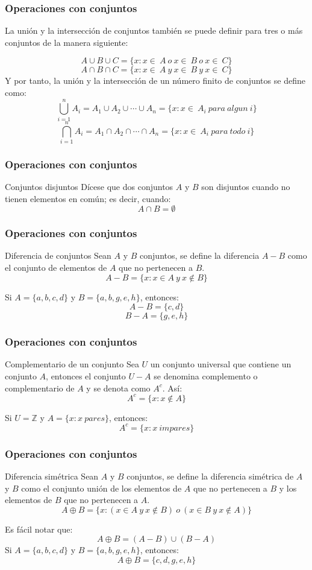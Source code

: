 \documentclass{beamer}
\begin{document}
\begin{frame}
\frametitle{Operaciones con conjuntos}
La uni\'on y la intersecci\'on de conjuntos tambi\'en se puede definir para tres o m\'as conjuntos de la manera siguiente:

\[A\cup B \cup C = \{x:x\in\ A\ o \ x\in\ B\ o \ x\in\ C\}\]
\[A\cap B \cap C = \{x:x\in\ A\ y \ x\in\ B\ y \ x\in\ C\}\]
Y por tanto, la uni\'on y la intersecci\'on de un n\'umero finito de conjuntos se define como:
\[\displaystyle\bigcup_{i=1}^n A_i = A_1\cup A_2\cup \cdots \cup A_n = \{x:x\in\ A_i\ para\ algun\ i\}\]
\[\displaystyle\bigcap_{i=1}^n A_i = A_1\cap A_2\cap \cdots \cap A_n = \{x:x\in\ A_i\ para\ todo \ i\}\]
\end{frame}



\begin{frame}
\frametitle{Operaciones con conjuntos}
\begin{block}{Conjuntos disjuntos}
D\'icese que dos conjuntos $A$ y $B$ son disjuntos cuando no tienen elementos en com\'un; es decir, cuando:
\[A\cap B = \emptyset\]
\end{block}
\end{frame}




\begin{frame}
\frametitle{Operaciones con conjuntos}
\begin{block}{Diferencia de conjuntos}
Sean $A$ y $B$ conjuntos, se define la diferencia $A-B$ como el conjunto de elementos de $A$ que no pertenecen a $B$.
\[A- B = \{x:x\in A \ y \ x\notin B\}\]
\end{block}
Si $A=\{a,b,c,d\}$ y $B = \{a,b,g,e,h\}$, entonces:
\[A-B = \{c,d\}\]
\[B-A = \{g,e,h\}\]
\end{frame}


\begin{frame}
\frametitle{Operaciones con conjuntos}
\begin{block}{Complementario de un conjunto}
Sea $U$ un conjunto universal que contiene un conjunto $A$, entonces el conjunto $U-A$ se denomina complemento o complementario de $A$ y se denota como $A^c$. As\'i:
\[A^c = \{x:x\notin A\}\]
\end{block}
Si $U=\mathbb{Z}$  y $A=\{x:x\ pares\}$, entonces:
\[A^c = \{x:x\ impares\}\]
\end{frame}


\begin{frame}
\frametitle{Operaciones con conjuntos}
\begin{block}{Diferencia sim\'etrica}
Sean $A$ y $B$ conjuntos, se define la diferencia sim\'etrica de $A$ y $B$ como el conjunto uni\'on de los elementos de $A$ que no pertenecen a $B$ y los elementos de $B$ que no pertenecen a $A$.
\[A \oplus B = \{x:(x\in A \ y \ x \notin B)\ o\ (x\in B\ y \ x\notin A )\}\]
\end{block}
Es f\'acil notar que: 
\[A \oplus B = (A-B)\cup (B-A)\]
Si $A=\{a,b,c,d\}$ y $B = \{a,b,g,e,h\}$, entonces:
\[A \oplus B = \{c,d,g,e,h\}\]
\end{frame}
\end{document}
